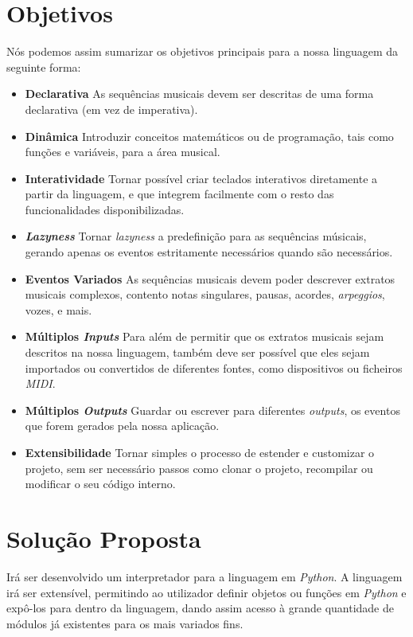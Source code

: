 \section{Objetivos}
Nós podemos assim sumarizar os objetivos principais para a nossa linguagem da seguinte forma:
\begin{itemize}
 \item \textbf{Declarativa} As sequências musicais devem ser descritas de uma forma declarativa (em vez de imperativa).
 \item \textbf{Dinâmica} Introduzir conceitos matemáticos ou de programação, tais como funções e variáveis, para a área musical.
 \item \textbf{Interatividade} Tornar possível criar teclados interativos diretamente a partir da linguagem, e que integrem facilmente com o resto  das funcionalidades  disponibilizadas.
 \item \textbf{\textit{Lazyness}} Tornar \textit{lazyness} a predefinição para as sequências músicais, gerando apenas os eventos estritamente necessários quando são necessários.
 \item \textbf{Eventos Variados} As sequências musicais devem poder descrever extratos musicais complexos, contento notas singulares, pausas, acordes, \textit{arpeggios}, vozes, e mais.
 \item \textbf{Múltiplos \textit{Inputs}} Para além de permitir que os extratos musicais sejam descritos na nossa linguagem, também deve ser possível que eles sejam importados ou convertidos de diferentes fontes, como dispositivos ou ficheiros \textit{MIDI}.
 \item \textbf{Múltiplos \textit{Outputs}} Guardar ou escrever para diferentes \textit{outputs}, os eventos que forem gerados pela nossa aplicação.
 \item \textbf{Extensibilidade} Tornar simples o processo de estender e customizar o projeto, sem ser necessário passos como clonar o projeto, recompilar ou modificar o seu código interno.
\end{itemize}

\section{Solução Proposta}
Irá ser desenvolvido um interpretador para a linguagem em \textit{Python}. A linguagem irá ser extensível, permitindo ao utilizador definir objetos ou funções em \textit{Python} e expô-los para dentro da linguagem, dando assim acesso à grande quantidade de módulos já existentes para os mais variados fins.

